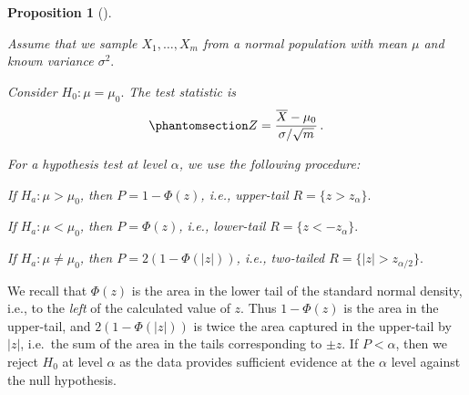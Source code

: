 \documentclass[
  a4paper,
  DIV=11,
  numbers=noendperiod,
  oneside]{scrreprt}
\theoremstyle{plain}
\theoremstyle{definition}
\theoremstyle{definition}
\theoremstyle{definition}
\theoremstyle{plain}
\newtheorem{proposition}{Proposition}[chapter]
\theoremstyle{remark}
\begin{document}
\begin{proposition}[]\protect\hypertarget{prp-htest-norm-known-var}{}\label{prp-htest-norm-known-var}

Assume that we sample \(X_1, \dots, X_m\) from a normal population with
mean \(\mu\) and known variance \(\sigma^2.\)

Consider \(H_0 : \mu = \mu_0.\) The test statistic is
\begin{equation}\phantomsection\label{eq-htest-norm-known-var-T}{
 Z = \frac{\overline{X} - \mu_0}{\sigma / \sqrt{m}}\,.
}\end{equation}

For a hypothesis test at level \(\alpha\), we use the following
procedure:

If \(H_a : \mu > \mu_0\), then \(P = 1 - \Phi(z)\), i.e., upper-tail
\(R = \{z > z_{\alpha}\}.\)

If \(H_a : \mu < \mu_0\), then \(P = \Phi(z)\), i.e., lower-tail
\(R = \{z < - z_{\alpha}\}.\)

If \(H_a : \mu \neq \mu_0\), then \(P = 2(1-\Phi(|z|))\), i.e.,
two-tailed \(R = \{|z| > z_{\alpha/2}\}.\)

\end{proposition}

We recall that \(\Phi(z)\) is the area in the lower tail of the standard
normal density, i.e., to the \emph{left} of the calculated value of
\(z.\) Thus \(1 - \Phi(z)\) is the area in the upper-tail, and
\(2(1 - \Phi(|z|))\) is twice the area captured in the upper-tail by
\(|z|\), i.e.~the sum of the area in the tails corresponding to
\(\pm z.\) If \(P < \alpha\), then we reject \(H_0\) at level \(\alpha\)
as the data provides sufficient evidence at the \(\alpha\) level against
the null hypothesis.
\end{document}

